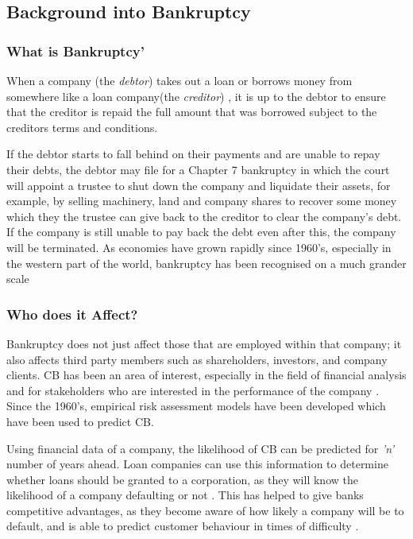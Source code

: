 \documentclass[11pt]{article}
\begin{document}
\subsection{Background into Bankruptcy}
\subsubsection{What is Bankruptcy' }\label{sec:bankdef}
When a company (the \textit{debtor}) takes out a loan or borrows money from somewhere like a loan company(the \textit{creditor}) , it is up to the debtor to ensure that the creditor is repaid the full amount that was borrowed subject to the creditors terms and conditions.


If the debtor starts to fall behind on their payments and are unable to repay their debts, the debtor may file for a Chapter 7 bankruptcy in which the court will appoint a trustee to shut down the company and liquidate their assets, for example, by selling machinery, land and company shares to recover some money which they the trustee can give back to the creditor to clear the company's debt. If the company is still unable to pay back the debt even after this, the company will be terminated. As economies have grown rapidly since 1960's, especially in the western part of the world, bankruptcy has been recognised on a much grander scale \cite{?}

\subsubsection{Who does it Affect?}
Bankruptcy does not just affect those that are employed within that company; it also affects third party members such as shareholders, investors, and company clients. CB has been an area of interest, especially in the field of financial analysis and for stakeholders who are interested in the performance of the company \cite{?}. Since the 1960's, empirical risk assessment models have been developed which have been used to predict CB. 

Using financial data of a company, the likelihood of CB can be predicted for \textit{'n'} number of years ahead. 
Loan companies can use this information to determine whether loans should be granted to a corporation, as they will know the likelihood of a company defaulting or not \cite{?}. This has helped to give banks competitive advantages, as they become aware of how likely a company will be to default, and is able to predict customer behaviour in times of difficulty \cite{?}.
\end{document}
